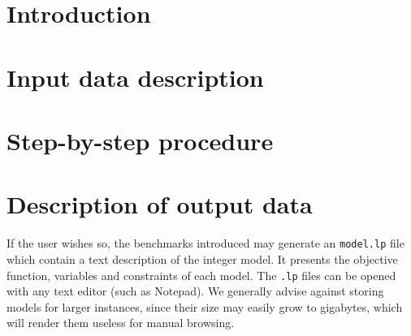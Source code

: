 \documentclass{article}
\begin{document}
\section{Introduction}



\section{Input data description}


\section{Step-by-step procedure}


\section{Description of output data}
If the user wishes so, the benchmarks introduced may generate an \texttt{model.lp} file which contain a text description of the integer model. It presents the objective function, variables and constraints of each model. The \texttt{.lp} files can be opened with any text editor (such as Notepad). 
We generally advise against storing models for larger instances, since their size may easily grow to gigabytes, which will render them useless for manual browsing. 
\newpage

  
\end{document}
